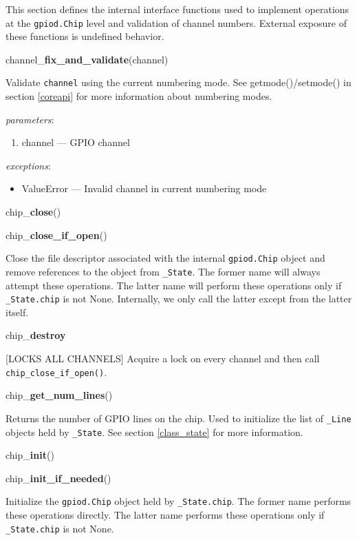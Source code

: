 \documentclass[12pt]{article}
\begin{document}
This section defines the internal interface functions used to implement operations at the \texttt{gpiod.Chip} level and validation of channel numbers. External exposure of these functions is undefined behavior.

\medskip

\noindent channel\_\textbf{fix\_and\_validate}(channel)

Validate \texttt{channel} using the current numbering mode.
See getmode()/setmode() in section \ref{coreapi} for more information about numbering modes.

\textit{parameters}:
\begin{enumerate}      
        \item channel --- GPIO channel
\end{enumerate}
 
 
\textit{exceptions}:
\begin{itemize}
    \item ValueError --- Invalid channel in current numbering mode
\end{itemize}

\noindent chip\_\textbf{close}()

\noindent chip\_\textbf{close\_if\_open}()

Close the file descriptor associated with the internal \texttt{gpiod.Chip} object and remove references to the object from \texttt{\_State}. The former name will always attempt these operations. The latter name will perform these operations only if \texttt{\_State.chip} is not None. Internally, we only call the latter except from the latter itself.

\noindent chip\_\textbf{destroy}

[LOCKS ALL CHANNELS] Acquire a lock on every channel and then call \texttt{chip\_close\_if\_open()}.

\noindent chip\_\textbf{get\_num\_lines}()

Returns the number of GPIO lines on the chip. Used to initialize the list of \texttt{\_Line} objects held by \texttt{\_State}. See section \ref{class_state} for more information.

\noindent chip\_\textbf{init}()

\noindent chip\_\textbf{init\_if\_needed}()

Initialize the \texttt{gpiod.Chip} object held by \texttt{\_State.chip}. The former name performs these operations directly. The latter name performs these operations only if \texttt{\_State.chip} is not None.
\end{document}
